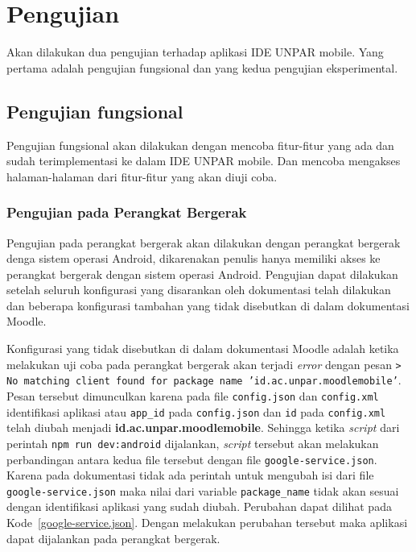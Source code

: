 \section{Pengujian}

Akan dilakukan dua pengujian terhadap aplikasi IDE UNPAR mobile. Yang pertama adalah pengujian fungsional dan yang kedua pengujian eksperimental.

\subsection{Pengujian fungsional}
\label{pengujian:fungsional}
Pengujian fungsional akan dilakukan dengan mencoba fitur-fitur yang ada dan sudah terimplementasi ke dalam IDE UNPAR mobile. Dan mencoba mengakses halaman-halaman dari fitur-fitur yang akan diuji coba.

\subsubsection{Pengujian pada Perangkat Bergerak}
Pengujian pada perangkat bergerak akan dilakukan dengan perangkat bergerak denga sistem operasi Android, dikarenakan penulis hanya memiliki akses ke perangkat bergerak dengan sistem operasi Android. Pengujian dapat dilakukan setelah seluruh konfigurasi yang disarankan oleh dokumentasi telah dilakukan dan beberapa konfigurasi tambahan yang tidak disebutkan di dalam dokumentasi Moodle.

Konfigurasi yang tidak disebutkan di dalam dokumentasi Moodle adalah ketika melakukan uji coba pada perangkat bergerak akan terjadi \textit{error} dengan pesan \texttt{> No matching client found for package name 'id.ac.unpar.moodlemobile'}. Pesan tersebut dimunculkan karena pada file \texttt{config.json} dan \texttt{config.xml} identifikasi aplikasi atau \texttt{app\_id} pada \texttt{config.json} dan \texttt{id} pada \texttt{config.xml} telah diubah menjadi \textbf{id.ac.unpar.moodlemobile}. Sehingga ketika \textit{script} dari perintah \texttt{npm run dev:android} dijalankan, \textit{script} tersebut akan melakukan perbandingan antara kedua file tersebut dengan file \texttt{google-service.json}. Karena pada dokumentasi tidak ada perintah untuk mengubah isi dari file \texttt{google-service.json} maka nilai dari variable \texttt{package\_name} tidak akan sesuai dengan identifikasi aplikasi yang sudah diubah. Perubahan dapat dilihat pada \mbox{Kode \ref{google-service.json}}. Dengan melakukan perubahan tersebut maka aplikasi dapat dijalankan pada perangkat bergerak.

